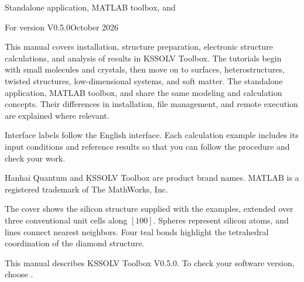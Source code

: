 \thispagestyle{plain}

\vspace{5mm}
\noindent Standalone application, MATLAB\regmark{} toolbox, and \ksonline{}\par
\noindent For version V0.5.0\quad October 2026

\vspace{7mm}
This manual covers installation, structure preparation, electronic structure calculations, and analysis of results in KSSOLV Toolbox. The tutorials begin with small molecules and crystals, then move on to surfaces, heterostructures, twisted structures, low-dimensional systems, and soft matter. The standalone application, MATLAB\regmark{} toolbox, and \ksonline{} share the same modeling and calculation concepts. Their differences in installation, file management, and remote execution are explained where relevant.

Interface labels follow the English interface. Each calculation example includes its input conditions and reference results so that you can follow the procedure and check your work.

\vspace{\baselineskip}

Hanhai Quantum\regmark{} and KSSOLV Toolbox are product brand names. MATLAB\regmark{} is a registered trademark of The MathWorks, Inc.

\vspace{\baselineskip}

The cover shows the silicon structure supplied with the examples, extended over three conventional unit cells along $[100]$. Spheres represent silicon atoms, and lines connect nearest neighbors. Four teal bonds highlight the tetrahedral coordination of the diamond structure.

\vfill
{}
\clearpage


\vspace{4mm}

This manual describes KSSOLV Toolbox V0.5.0. To check your software version, choose .

\vspace{\baselineskip}

